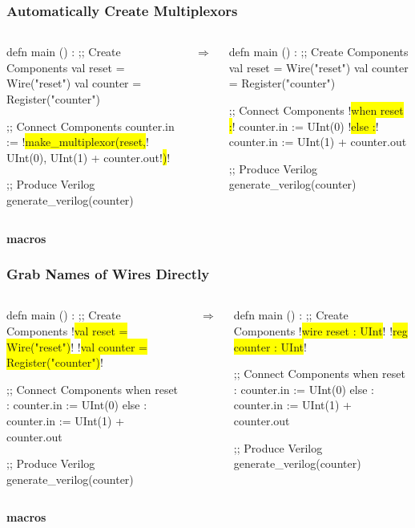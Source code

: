 \documentclass[xcolor=pdflatex,dvipsnames,table]{beamer}
\begin{document}
\begin{frame}[fragile]
\frametitle{Automatically Create Multiplexors}
\begin{columns}
{
\begin{stanza}
defn main () :
  ;; Create Components
  val reset   = Wire("reset")
  val counter = Register("counter")

  ;; Connect Components
  counter.in :=
    !\colorbox{yellow}{make\_multiplexor(reset,}!
      UInt(0),
      UInt(1) + counter.out!\colorbox{yellow}{)}!

  ;; Produce Verilog
  generate_verilog(counter)
\end{stanza}
}
\begin{center}
$\Rightarrow$
\end{center}
{
\begin{stanza}
defn main () :
  ;; Create Components
  val reset   = Wire("reset")
  val counter = Register("counter")

  ;; Connect Components
  !\colorbox{yellow}{when reset :}!
    counter.in := UInt(0)
  !\colorbox{yellow}{else :}!
    counter.in := UInt(1) + counter.out

  ;; Produce Verilog
  generate_verilog(counter)
\end{stanza}
}
\end{columns}
\vspace{1cm}
{\bf macros}
\end{frame}

\begin{frame}[fragile]
\frametitle{Grab Names of Wires Directly}
\begin{columns}
{
\begin{stanza}
defn main () :
  ;; Create Components
  !\colorbox{yellow}{val reset   = Wire("reset")}!
  !\colorbox{yellow}{val counter = Register("counter")}!

  ;; Connect Components
  when reset :
    counter.in := UInt(0)
  else :
    counter.in := UInt(1) + counter.out

  ;; Produce Verilog
  generate_verilog(counter)
\end{stanza}
}
\begin{center}
$\Rightarrow$
\end{center}
{
\begin{stanza}
defn main () :
  ;; Create Components
  !\colorbox{yellow}{wire reset  : UInt}!
  !\colorbox{yellow}{reg counter : UInt}!

  ;; Connect Components
  when reset :
    counter.in := UInt(0)
  else :
    counter.in := UInt(1) + counter.out

  ;; Produce Verilog
  generate_verilog(counter)
\end{stanza}
}
\end{columns}
\vspace{1cm}
{\bf macros}
\end{frame}
\end{document}
